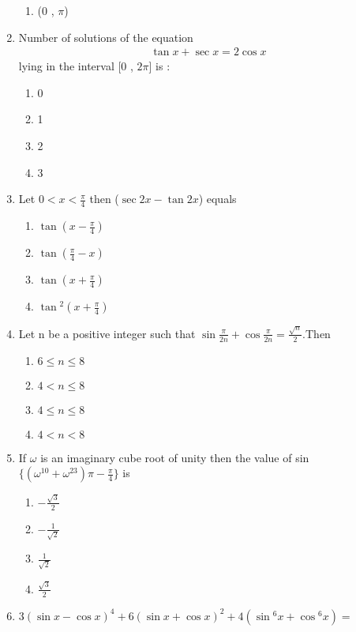 \begin{enumerate}[label=\arabic*.,ref=\thesubsection.\theenumi]
\begin{enumerate}
       \item (0 , $\pi$)
   \end{enumerate}
   \item Number of solutions of the equation 
   \begin{align}
       \tan{x} + \sec{x} = 2\cos{x}
   \end{align} 
   lying in the interval [0 , $2\pi$] is :
   \begin{enumerate}
       \item 0
       \item 1
       \item 2
       \item 3
   \end{enumerate}
   \item Let $0< x<\frac{\pi}{4}$ then ($\sec{2x} - \tan{2x}$) equals 
   \begin{enumerate}
       \item $\tan{(x - \frac{\pi}{4})}$
       \item $\tan {(\frac{\pi}{4} - x)}$
       \item $\tan{(x + \frac{\pi}{4})}$
       \item $\tan{^2 (x + \frac{\pi}{4})}$
   \end{enumerate}
   \item Let n be a positive integer such that $\sin{\frac{\pi}{2n}}+\cos{\frac{\pi}{2n}} = \frac{\sqrt n}{2}$.Then
   \begin{enumerate}
       \item $6\leq n\leq 8$
       \item $4< n\leq 8$
       \item $4\leq n\leq 8$
       \item $4< n< 8$
   \end{enumerate}
   \item If $\omega$ is an imaginary cube root of unity then the value of sin $\{(\omega^{10} + \omega^{23}) \pi -\frac{\pi}{4}\}$ is 
   \begin{enumerate}
       \item $-\frac{\sqrt3}{2}$
       \item $-\frac{1}{\sqrt2}$
       \item  $\frac{1}{\sqrt2}$
       \item  $\frac{\sqrt3}{2}$
   \end{enumerate}
   \item $3(\sin{x} -\cos{x})^4 + 6(\sin{x} +\cos{x})^2 + 4(\sin{^6x}+ \cos{^6x}) =$
   \begin{enumerate}

\end{enumerate}
\end{enumerate}

